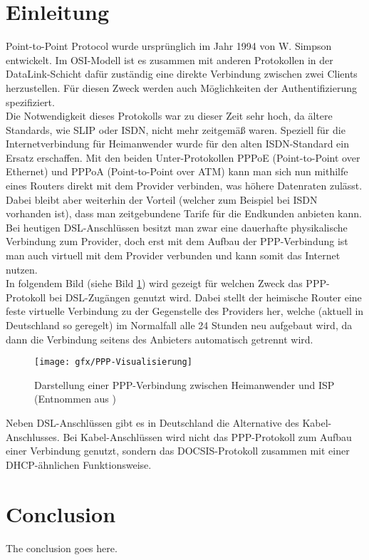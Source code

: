 \documentclass[journal]{IEEEtran}
\begin{document}
\section{Einleitung} 
 Point-to-Point Protocol wurde urspr\"unglich im Jahr 1994 von W. Simpson entwickelt. Im OSI-Modell ist es zusammen mit anderen Protokollen in der DataLink-Schicht daf\"ur zust\"andig eine direkte Verbindung zwischen zwei Clients herzustellen. Für diesen Zweck werden auch M\"oglichkeiten der Authentifizierung spezifiziert. \cite{RFC1661} \\
Die Notwendigkeit dieses Protokolls war zu dieser Zeit sehr hoch, da \"altere Standards, wie SLIP oder ISDN, nicht mehr zeitgem\"a\ss{} waren. Speziell für die Internetverbindung für Heimanwender wurde f\"ur den alten ISDN-Standard ein Ersatz erschaffen. Mit den beiden Unter-Protokollen PPPoE (Point-to-Point over Ethernet)\cite{RFC2516} und PPPoA (Point-to-Point over ATM)\cite{RFC2364} kann man sich nun mithilfe eines Routers direkt mit dem Provider verbinden, was h\"ohere Datenraten zul\"asst. Dabei bleibt aber weiterhin der Vorteil (welcher zum Beispiel bei ISDN vorhanden ist), dass man zeitgebundene Tarife für die Endkunden anbieten kann. Bei heutigen DSL-Anschl\"ussen besitzt man zwar eine dauerhafte physikalische Verbindung zum Provider, doch erst mit dem Aufbau der PPP-Verbindung ist man auch virtuell mit dem Provider verbunden und kann somit das Internet nutzen. \\
In folgendem Bild (siehe Bild \ref{fig:PPP-Visualisierung}) wird gezeigt f\"ur welchen Zweck das PPP-Protokoll bei DSL-Zug\"angen genutzt wird. Dabei stellt der heimische Router eine feste virtuelle Verbindung zu der Gegenstelle des Providers her, welche (aktuell in Deutschland so geregelt) im Normalfall alle 24 Stunden neu aufgebaut wird, da dann die Verbindung seitens des Anbieters automatisch getrennt wird. \\
\begin{figure}[h!]
 \centering
  \texttt{[image: gfx/PPP-Visualisierung]}
 \caption{Darstellung einer PPP-Verbindung zwischen Heimanwender und ISP (Entnommen aus \cite{PPP-Bild})}
 \label{fig:PPP-Visualisierung}
\end{figure}
Neben DSL-Anschl\"ussen gibt es in Deutschland die Alternative des Kabel-Anschlusses. Bei Kabel-Anschl\"ussen wird nicht das PPP-Protokoll zum Aufbau einer Verbindung genutzt, sondern das DOCSIS-Protokoll zusammen mit einer DHCP-\"ahnlichen \cite{RFC3256} Funktionsweise. 
\section{Conclusion} 
The conclusion goes here. 
\end{document}
